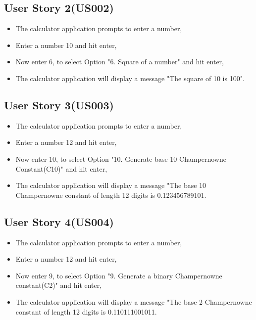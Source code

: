 \documentclass[12pt, a4paper]{report}
\begin{document}
\subsection{User Story 2(US002)}
\begin{itemize}
    \item The calculator application prompts to enter a number,
    \item Enter a number 10 and hit enter,
    \item Now enter 6, to select Option "6. Square of a number" and hit enter,
    \item The calculator application will display a message "The square of 10 is 100".
\end{itemize}

\subsection{User Story 3(US003)}
\begin{itemize}
    \item The calculator application prompts to enter a number,
    \item Enter a number 12 and hit enter,
    \item Now enter 10, to select Option "10. Generate base 10 Champernowne Constant(C10)" and hit enter,
    \item The calculator application will display a message "The base 10 Champernowne constant of length 12 digits is 0.123456789101.
\end{itemize}

\subsection{User Story 4(US004)}
\begin{itemize}
    \item The calculator application prompts to enter a number,
    \item Enter a number 12 and hit enter,
    \item Now enter 9, to select Option "9. Generate a binary Champernowne constant(C2)" and hit enter,
    \item The calculator application will display a message "The base 2 Champernowne constant of length 12 digits is 0.110111001011.
\end{itemize}
\end{document}
